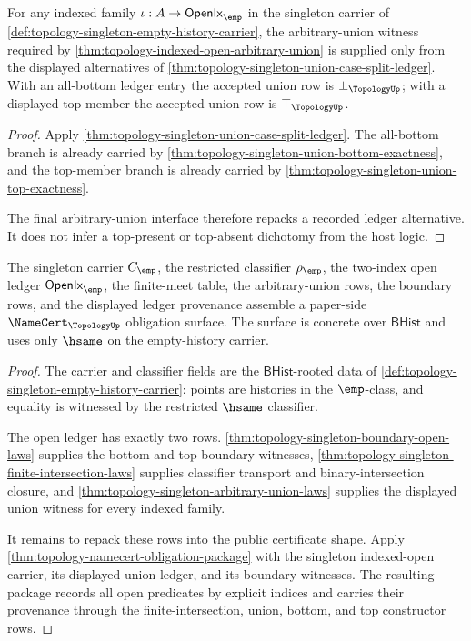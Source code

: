 \begin{theorem}
\label{thm:topology-singleton-arbitrary-union-laws}
For any indexed family $\iota:A\to\mathsf{OpenIx}_{\emp}$ in the singleton carrier of \autoref{def:topology-singleton-empty-history-carrier}, the arbitrary-union witness required by \autoref{thm:topology-indexed-open-arbitrary-union} is supplied only from the displayed alternatives of \autoref{thm:topology-singleton-union-case-split-ledger}. With an all-bottom ledger entry the accepted union row is $\bot_{\TopologyUp}$; with a displayed top member the accepted union row is $\top_{\TopologyUp}$.
\end{theorem}
\begin{proof}
Apply \autoref{thm:topology-singleton-union-case-split-ledger}. The all-bottom branch is already carried by \autoref{thm:topology-singleton-union-bottom-exactness}, and the top-member branch is already carried by \autoref{thm:topology-singleton-union-top-exactness}.

The final arbitrary-union interface therefore repacks a recorded ledger alternative. It does not infer a top-present or top-absent dichotomy from the host logic.
\end{proof}

\begin{theorem}
\label{thm:topology-singleton-namecert-obligation-surface}
The singleton carrier $C_{\emp}$, the restricted classifier $\rho_{\emp}$, the two-index open ledger $\mathsf{OpenIx}_{\emp}$, the finite-meet table, the arbitrary-union rows, the boundary rows, and the displayed ledger provenance assemble a paper-side $\NameCert_{\TopologyUp}$ obligation surface. The surface is concrete over $\mathsf{BHist}$ and uses only $\hsame$ on the empty-history carrier.
\end{theorem}
\begin{proof}
The carrier and classifier fields are the $\mathsf{BHist}$-rooted data of \autoref{def:topology-singleton-empty-history-carrier}: points are histories in the $\emp$-class, and equality is witnessed by the restricted $\hsame$ classifier.

The open ledger has exactly two rows. \autoref{thm:topology-singleton-boundary-open-laws} supplies the bottom and top boundary witnesses, \autoref{thm:topology-singleton-finite-intersection-laws} supplies classifier transport and binary-intersection closure, and \autoref{thm:topology-singleton-arbitrary-union-laws} supplies the displayed union witness for every indexed family.

It remains to repack these rows into the public certificate shape. Apply \autoref{thm:topology-namecert-obligation-package} with the singleton indexed-open carrier, its displayed union ledger, and its boundary witnesses. The resulting package records all open predicates by explicit indices and carries their provenance through the finite-intersection, union, bottom, and top constructor rows.
\end{proof}

